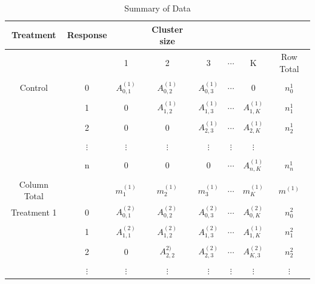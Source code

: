 \documentclass[12pt,oneside]{report}
\theoremstyle{definition}
\theoremstyle{mystyle}
\begin{document}
\begin{table}[h!]
	\begin{center}
		\caption{Summary of Data}
		\begin{tabular}{c c|c c c c c c}
			\hline
			Treatment&Response  &  &Cluster size  & &&& \\
			[0.5ex]
			\hline
			& & 1& 2 &3&$\cdots$&K&Row Total \\
			[0.5ex]
			\hline
			&&&&&&&\\
			Control&0&$ A_{0,1}^{(1)}$& $A_{0,2}^{(1)}$ &$A_{0,3}^{(1)}$& $\cdots$ &0&$n_{0}^{1}$ \\
			&&&&&&&\\
			&1 &0 & $ A_{1,2}^{(1)}$ & $ A_{1,3}^{(1)}$  & $\cdots$  &$A_{1,K}^{(1)}$& $n_{1}^{1}$ \\
			&&&&&&&\\
			&2 &$ 0$ & 0 & $ A_{2,3}^{(1)}$  & $\cdots$  &$A_{2,K}^{(1)}$&$n_{2}^{1}$ \\
			&&&&&&&\\
			&$\vdots$ & $\vdots$ & $\vdots$  & $\vdots$  & $\vdots$  & $\vdots$&  \\
			&&&&&&&\\
			
			&n & $ 0$  & $0$  &$ 0$  & $\cdots$  & $ A_{n,K}^{(1)}$&$n_{n}^{1}$\\ [1ex]
			&&&&&&&\\
			Column Total	& & $m_{1}^{(1)}$ & $m_{2}^{(1)}$ &$m_{3}^{(1)}$& $\cdots$  & $m_{K}^{(1)}$&$m^{(1)}$ \\ [1ex]
			\hline
			Treatment 1&0&$ A_{0,1}^{(2)}$& $A_{0,2}^{(2)}$ &$A_{0,3}^{(2)}$& $\cdots$ &$A_{0,K}^{(2)}$&$n_{0}^{2}$\\
			&&&&&&&\\
			&1 &$ A_{1,1}^{(2)}$ & $ A_{1,2}^{(2)}$ & $ A_{1,3}^{(2)}$  & $\cdots$  &$A_{1,K}^{(1)}$&$n_{1}^{2}$ \\
			&&&&&&&\\
			&2 &$ 0$ & $ A_{2,2}^{2)}$ & $ A_{2,3}^{(2)}$  & $\cdots$  &$A_{K,3}^{(2)}$&$n_{2}^{2}$ \\
			&&&&&&&\\
			&$\vdots$ & $\vdots$ & $\vdots$  & $\vdots$  & $\vdots$  & $\vdots$&$\vdots$   \\
			

\end{tabular}
\end{center}
\end{table}
\end{document}
